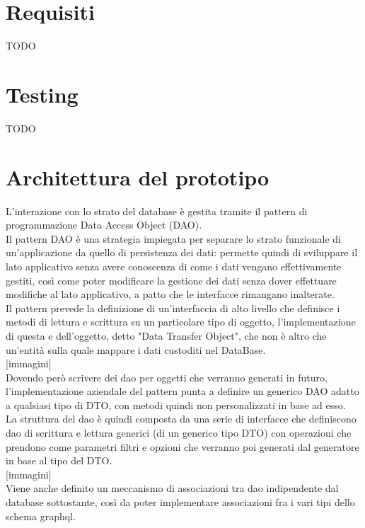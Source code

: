 \documentclass[a4paper, 12pt]{scrartcl}
\begin{document}
  \section*{Requisiti}
    TODO

  \newpage
  \section*{Testing}
    TODO

  \newpage  
  \section*{Architettura del prototipo}
      L'interazione con lo strato del database è gestita tramite il pattern di programmazione Data Access Object (DAO).\\
      Il pattern DAO è una strategia impiegata per separare lo strato funzionale di un'applicazione da quello di persistenza dei dati: permette quindi di sviluppare il lato applicativo senza avere conoscenza di come i dati vengano effettivamente gestiti, così come poter modificare la gestione dei dati
      senza dover effettuare modifiche al lato applicativo, a patto che le interfacce rimangano inalterate.\\
      Il pattern prevede la definizione di un'interfaccia di alto livello che definisce i metodi di lettura e scrittura su un particolare tipo di oggetto, l'implementazione di questa e dell'oggetto, detto "Data Transfer Object", che non è altro che un'entità sulla quale mappare i dati custoditi nel DataBase.\\
      
      [immagini]\\

      Dovendo però scrivere dei dao per oggetti che verranno generati in futuro, l'implementazione aziendale del pattern punta a definire un generico DAO adatto a qualsiasi tipo di DTO, con metodi quindi non personalizzati in base ad esso.\\
      La struttura del dao è quindi composta da una serie di interfacce che definiscono dao di scrittura e lettura generici (di un generico tipo DTO) con operazioni che prendono come parametri filtri e opzioni che verranno poi generati dal generatore in base al tipo del DTO.\\
      
      [immagini]\\
      
      Viene anche definito un meccanismo di associazioni tra dao indipendente dal database sottostante, così da poter implementare associazioni fra i vari tipi dello schema graphql.\\
\end{document}
